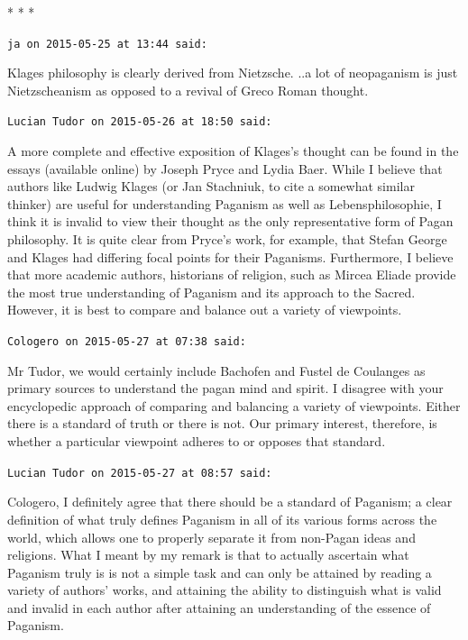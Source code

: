 
\begin{center}* * *\end{center}

\begin{footnotesize}
\begin{sffamily}
\texttt{ja on 2015-05-25 at 13:44 said:}

Klages philosophy is clearly derived from Nietzsche. ..a lot of neopaganism is just Nietzscheanism as opposed to a revival of Greco Roman thought.

\hfill

\texttt{Lucian Tudor on 2015-05-26 at 18:50 said:}

A more complete and effective exposition of Klages's thought can be found in the essays (available online) by Joseph Pryce and Lydia Baer. While I believe that authors like Ludwig Klages (or Jan Stachniuk, to cite a somewhat similar thinker) are useful for understanding Paganism as well as Lebensphilosophie, I think it is invalid to view their thought as the only representative form of Pagan philosophy. It is quite clear from Pryce's work, for example, that Stefan George and Klages had differing focal points for their Paganisms. Furthermore, I believe that more academic authors, historians of religion, such as Mircea Eliade provide the most true understanding of Paganism and its approach to the Sacred. However, it is best to compare and balance out a variety of viewpoints.

\hfill

\texttt{Cologero on 2015-05-27 at 07:38 said:}

Mr Tudor, we would certainly include Bachofen and Fustel de Coulanges as primary sources to understand the pagan mind and spirit. I disagree with your encyclopedic approach of comparing and balancing a variety of viewpoints. Either there is a standard of truth or there is not. Our primary interest, therefore, is whether a particular viewpoint adheres to or opposes that standard.

\hfill

\texttt{Lucian Tudor on 2015-05-27 at 08:57 said:}

Cologero, I definitely agree that there should be a standard of Paganism; a clear definition of what truly defines Paganism in all of its various forms across the world, which allows one to properly separate it from non-Pagan ideas and religions. What I meant by my remark is that to actually ascertain what Paganism truly is is not a simple task and can only be attained by reading a variety of authors' works, and attaining the ability to distinguish what is valid and invalid in each author after attaining an understanding of the essence of Paganism.


\end{sffamily}
\end{footnotesize}
